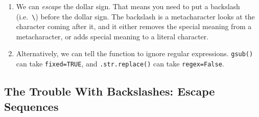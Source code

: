 \documentclass[
  12pt,
  krantz2]{krantz}
\makeatletter
\newenvironment{Shaded}{\begin{snugshade}}{\end{snugshade}}
\newcommand{\AttributeTok}[1]{\textcolor[rgb]{0.61,0.61,0.61}{#1}}
\newcommand{\BuiltInTok}[1]{#1}
\newcommand{\CommentTok}[1]{\textcolor[rgb]{0.37,0.37,0.37}{\textit{#1}}}
\newcommand{\ConstantTok}[1]{\textcolor[rgb]{0,0,0}{#1}}
\newcommand{\DocumentationTok}[1]{\textcolor[rgb]{0.37,0.37,0.37}{\textbf{\textit{#1}}}}
\newcommand{\FunctionTok}[1]{\textcolor[rgb]{0,0,0}{#1}}
\newcommand{\NormalTok}[1]{#1}
\newcommand{\OperatorTok}[1]{\textcolor[rgb]{0.43,0.43,0.43}{\textbf{#1}}}
\newcommand{\SpecialCharTok}[1]{\textcolor[rgb]{0,0,0}{#1}}
\newcommand{\StringTok}[1]{\textcolor[rgb]{0.5,0.5,0.5}{#1}}
\newcommand{\VariableTok}[1]{\textcolor[rgb]{0,0,0}{#1}}
\providecommand{\tightlist}{%
  \setlength{\itemsep}{0pt}\setlength{\parskip}{0pt}}
\newenvironment{kframe}{%
\medskip{}
\setlength{\fboxsep}{.8em}
 \def\at@end@of@kframe{}%
 \ifinner\ifhmode%
  \def\at@end@of@kframe{\end{minipage}}%
  \begin{minipage}{\columnwidth}%
 \fi\fi%
 \def\FrameCommand##1{\hskip\@totalleftmargin \hskip-\fboxsep
 \colorbox{shadecolor}{##1}\hskip-\fboxsep
     \hskip-\linewidth \hskip-\@totalleftmargin \hskip\columnwidth}%
 \MakeFramed {\advance\hsize-\width
   \@totalleftmargin\z@ \linewidth\hsize
   \@setminipage}}%
 {\par\unskip\endMakeFramed%
 \at@end@of@kframe}
\renewenvironment{Shaded}{\begin{kframe}}{\end{kframe}}
\makeatother
\begin{document}
\begin{enumerate}
\def\labelenumi{\arabic{enumi}.}
\tightlist
\item
  We can \emph{escape} the dollar sign. That means you need to put a backslash (i.e.~\texttt{\textbackslash{}}) before the dollar sign. The backslash is a metacharacter looks at the character coming after it, and it either removes the special meaning from a metacharacter, or adds special meaning to a literal character.
\item
  Alternatively, we can tell the function to ignore regular expressions. \texttt{gsub()} can take \texttt{fixed=TRUE}, and \texttt{.str.replace()} can take \texttt{regex=False}.
\end{enumerate}

\begin{Shaded}
\end{Shaded}

\begin{Shaded}
\end{Shaded}

\hypertarget{the-trouble-with-backslashes-escape-sequences}{%
\subsection{The Trouble With Backslashes: Escape Sequences}\label{the-trouble-with-backslashes-escape-sequences}}
\end{document}
